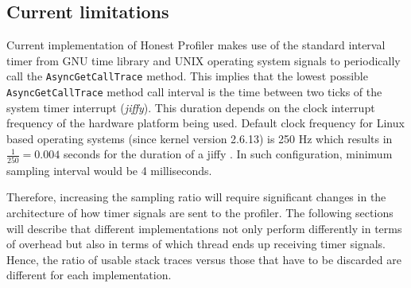 \documentclass[..thesis.tex]{subfiles}
\begin{document}

\subsection{Current limitations}
Current implementation of Honest Profiler makes use of the standard interval timer from GNU time library and UNIX operating system signals to periodically call the \texttt{AsyncGetCallTrace} method. This implies that the lowest possible \texttt{Async\-Get\-Call\-Trace} method call interval is the time between two ticks of the system timer interrupt (\textit{jiffy}). This duration depends on the clock interrupt frequency of the hardware platform being used. Default clock frequency for Linux based operating systems (since kernel version 2.6.13) is 250 Hz which results in $\frac{1}{250} = 0.004$ seconds for the duration of a jiffy \cite{linux_time}. In such configuration, minimum sampling interval would be 4 milliseconds.

Therefore, increasing the sampling ratio will require significant changes in the architecture of how timer signals are sent to the profiler. The following sections will describe that different implementations not only perform differently in terms of overhead but also in terms of which thread ends up receiving timer signals. Hence, the ratio of usable stack traces versus those that have to be discarded are different for each implementation.

\end{document}
